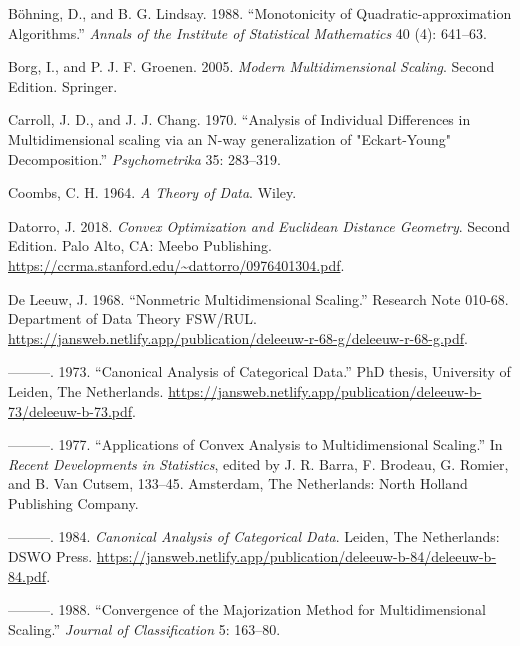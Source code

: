 \documentclass[
  12pt,
  letterpaper,
  DIV=11,
  numbers=noendperiod]{scrartcl}
\newlength{\cslhangindent}
\newenvironment{CSLReferences}[2] %
 {\begin{list}{}{%
  \setlength{\itemindent}{0pt}
  \setlength{\leftmargin}{0pt}
  \setlength{\parsep}{0pt}
  \ifodd #1
   \setlength{\leftmargin}{\cslhangindent}
   \setlength{\itemindent}{-1\cslhangindent}
  \fi
  \setlength{\itemsep}{#2\baselineskip}}}
 {\end{list}}
\begin{document}
\label{refs}
\begin{CSLReferences}{1}{0}
Böhning, D., and B. G. Lindsay. 1988. {``{Monotonicity of
Quadratic-approximation Algorithms}.''} \emph{Annals of the Institute of
Statistical Mathematics} 40 (4): 641--63.

Borg, I., and P. J. F. Groenen. 2005. \emph{Modern Multidimensional
Scaling}. Second Edition. Springer.

Carroll, J. D., and J. J. Chang. 1970. {``{Analysis of Individual
Differences in Multidimensional scaling via an N-way generalization of
"Eckart-Young" Decomposition.}''} \emph{Psychometrika} 35: 283--319.

Coombs, C. H. 1964. \emph{{A Theory of Data}}. Wiley.

Datorro, J. 2018. \emph{Convex Optimization and Euclidean Distance
Geometry}. Second Edition. Palo Alto, CA: Meebo Publishing.
\url{https://ccrma.stanford.edu/~dattorro/0976401304.pdf}.

De Leeuw, J. 1968. {``Nonmetric Multidimensional Scaling.''} Research
Note 010-68. Department of Data Theory FSW/RUL.
\url{https://jansweb.netlify.app/publication/deleeuw-r-68-g/deleeuw-r-68-g.pdf}.

---------. 1973. {``Canonical Analysis of Categorical Data.''} PhD
thesis, University of Leiden, The Netherlands.
\url{https://jansweb.netlify.app/publication/deleeuw-b-73/deleeuw-b-73.pdf}.

---------. 1977. {``Applications of Convex Analysis to Multidimensional
Scaling.''} In \emph{Recent Developments in Statistics}, edited by J. R.
Barra, F. Brodeau, G. Romier, and B. Van Cutsem, 133--45. Amsterdam, The
Netherlands: North Holland Publishing Company.

---------. 1984. \emph{Canonical Analysis of Categorical Data}. Leiden,
The Netherlands: DSWO Press.
\url{https://jansweb.netlify.app/publication/deleeuw-b-84/deleeuw-b-84.pdf}.

---------. 1988. {``Convergence of the Majorization Method for
Multidimensional Scaling.''} \emph{Journal of Classification} 5:
163--80.


\end{CSLReferences}
\end{document}
